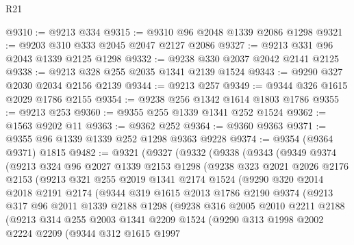 \begin{lexlean}{R21}
\begin{coremodule}
@9310 := @9213 @334
@9315 := @9310 @96 @2048 @1339 @2086 @1298
@9321 := @9203 @310 @333 @2045 @2047 @2127 @2086
@9327 := @9213 @331 @96 @2043 @1339 @2125 @1298
@9332 := @9238 @330 @2037 @2042 @2141 @2125
@9338 := @9213 @328 @255 @2035 @1341 @2139 @1524
@9343 := @9290 @327 @2030 @2034 @2156 @2139
@9344 := @9213 @257
@9349 := @9344 @326 @1615 @2029 @1786 @2155
@9354 := @9238 @256 @1342 @1614 @1803 @1786
@9355 := @9213 @253
@9360 := @9355 @255 @1339 @1341 @252 @1524
@9362 := @1563 @9202 @11
@9363 := @9362 @252
@9364 := @9360 @9363
@9371 := @9355 @96 @1339 @1339 @252 @1298 @9363 @9228
@9374 := @9354 (@9364 @9371) @1815
@9482 := @9321
    (@9327
      (@9332
        (@9338
          (@9343
            (@9349
              @9374
              (@9213
                @324
                @96
                @2027
                @1339
                @2153
                @1298
                (@9238
                  @323
                  @2021
                  @2026
                  @2176
                  @2153
                  (@9213
                    @321
                    @255
                    @2019
                    @1341
                    @2174
                    @1524
                    (@9290
                      @320
                      @2014
                      @2018
                      @2191
                      @2174
                      (@9344
                        @319
                        @1615
                        @2013
                        @1786
                        @2190
                        @9374
                        (@9213
                          @317
                          @96
                          @2011
                          @1339
                          @2188
                          @1298
                          (@9238
                            @316
                            @2005
                            @2010
                            @2211
                            @2188
                            (@9213
                              @314
                              @255
                              @2003
                              @1341
                              @2209
                              @1524
                              (@9290
                                @313
                                @1998
                                @2002
                                @2224
                                @2209
                                (@9344
                                  @312
                                  @1615
                                  @1997

\end{coremodule}
\end{lexlean}
